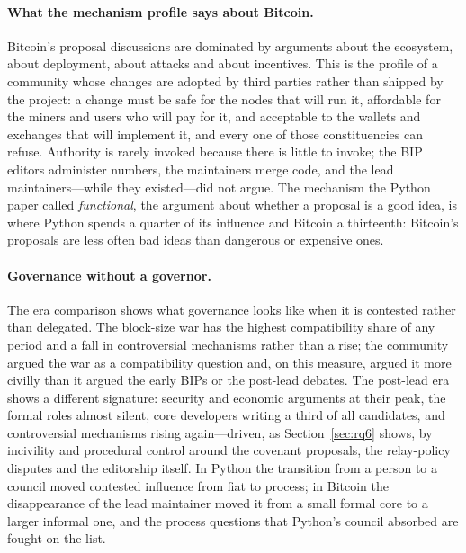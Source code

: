 \documentclass[sigconf,screen]{acmart}
\begin{document}
\paragraph{What the mechanism profile says about Bitcoin.} Bitcoin's proposal discussions are dominated by arguments about the ecosystem, about deployment, about attacks and about incentives. This is the profile of a community whose changes are adopted by third parties rather than shipped by the project: a change must be safe for the nodes that will run it, affordable for the miners and users who will pay for it, and acceptable to the wallets and exchanges that will implement it, and every one of those constituencies can refuse. Authority is rarely invoked because there is little to invoke; the BIP editors administer numbers, the maintainers merge code, and the lead maintainers---while they existed---did not argue. The mechanism the Python paper called \emph{functional}, the argument about whether a proposal is a good idea, is where Python spends a quarter of its influence and Bitcoin a thirteenth: Bitcoin's proposals are less often bad ideas than dangerous or expensive ones.

\paragraph{Governance without a governor.} The era comparison shows what governance looks like when it is contested rather than delegated. The block-size war has the highest compatibility share of any period and a fall in controversial mechanisms rather than a rise; the community argued the war as a compatibility question and, on this measure, argued it more civilly than it argued the early BIPs or the post-lead debates. The post-lead era shows a different signature: security and economic arguments at their peak, the formal roles almost silent, core developers writing a third of all candidates, and controversial mechanisms rising again---driven, as Section~\ref{sec:rq6} shows, by incivility and procedural control around the covenant proposals, the relay-policy disputes and the editorship itself. In Python the transition from a person to a council moved contested influence from fiat to process; in Bitcoin the disappearance of the lead maintainer moved it from a small formal core to a larger informal one, and the process questions that Python's council absorbed are fought on the list.
\end{document}
